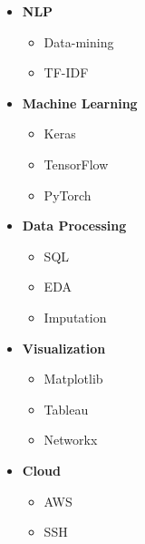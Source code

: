 \begin{multicols}{2}
\begin{itemize}[label={}]
        \item \textbf{NLP}
        \vspace{.125 cm}
        \begin{itemize}[label={}]
             \item Data-mining
             \item TF-IDF
        \vspace{.125 cm}
        \end{itemize}
        
        \item \textbf{Machine Learning}
        \vspace{.125 cm}
        \begin{itemize}[label={}]
             \item Keras
             \item TensorFlow
             \item PyTorch
        \vspace{.125 cm}
        \end{itemize}
        
        \item \textbf{Data Processing}
        \vspace{.125 cm}
        \begin{itemize}[label={}]
             \item SQL
             \item EDA
             \item Imputation
        \vspace{.125 cm}
        \end{itemize}
        
        \item \textbf{Visualization}
        \vspace{.125 cm}
        \begin{itemize}[label={}]
             \item Matplotlib
             \item Tableau
             \item Networkx
        \vspace{.125 cm}
        \end{itemize}
        
        \item \textbf{Cloud}
        \vspace{.125 cm}
        \begin{itemize}[label={}]
             \item AWS
             \item SSH
        \vspace{.125 cm}
        \end{itemize}

\end{itemize}
\end{multicols}

\vspace{-.25 cm}


\divider


\divider

